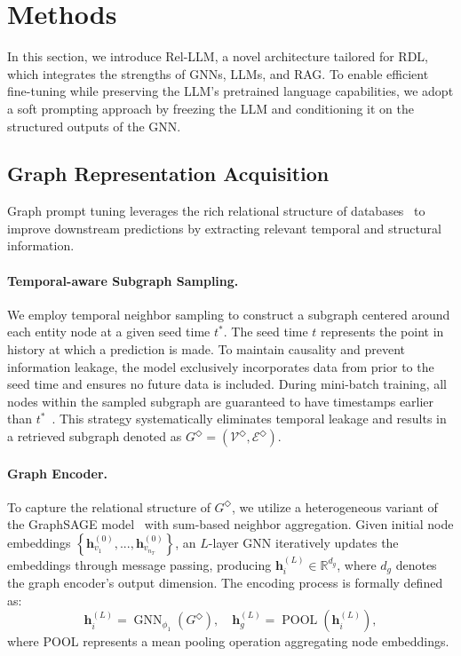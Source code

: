 \documentclass[11pt]{article}
\begin{document}
\section{Methods}
In this section, we introduce Rel-LLM, a novel architecture tailored for RDL, which integrates the strengths of GNNs, LLMs, and RAG. To enable efficient fine-tuning while preserving the LLM’s pretrained language capabilities, we adopt a soft prompting approach by freezing the LLM and conditioning it on the structured outputs of the GNN.

\subsection{Graph Representation Acquisition}
Graph prompt tuning leverages the rich relational structure of databases~\citep{he2024g} to improve downstream predictions by extracting relevant temporal and structural information.

\paragraph{Temporal-aware Subgraph Sampling.} We employ temporal neighbor sampling to construct a subgraph centered around each entity node at a given seed time $t^*$. The seed time $t$ represents the point in history at which a prediction is made. To maintain causality and prevent information leakage, the model exclusively incorporates data from prior to the seed time and ensures no future data is included. During mini-batch training, all nodes within the sampled subgraph are guaranteed to have timestamps earlier than $t^*$~\citep{hamilton2017inductive}. This strategy systematically eliminates temporal leakage and results in a retrieved subgraph denoted as $G^\Diamond = (\mathcal{V}^\Diamond, \mathcal{E}^\Diamond)$.

\paragraph{Graph Encoder.}
To capture the relational structure of $G^\Diamond$, we utilize a heterogeneous variant of the GraphSAGE model~\citep{hamilton2017inductive} with sum-based neighbor aggregation. Given initial node embeddings $\left\{\mathbf{h}_{v_1}^{(0)},...,\mathbf{h}_{v_{n_T}}^{(0)}\right\}$, an $L$-layer GNN iteratively updates the embeddings through message passing, producing $\mathbf{h}_i^{(L)} \in \mathbb{R}^{d_g}$, where $d_g$ denotes the graph encoder’s output dimension. The encoding process is formally defined as:
\begin{equation}
    \mathbf{h}_i^{(L)} = \operatorname{GNN}_{\phi_1}\left(G^\Diamond\right),\quad \mathbf{h}_g^{(L)} =\operatorname{POOL}\left(\mathbf{h}_i^{(L)}\right),
\end{equation}
where POOL represents a mean pooling operation aggregating node embeddings.
\end{document}
